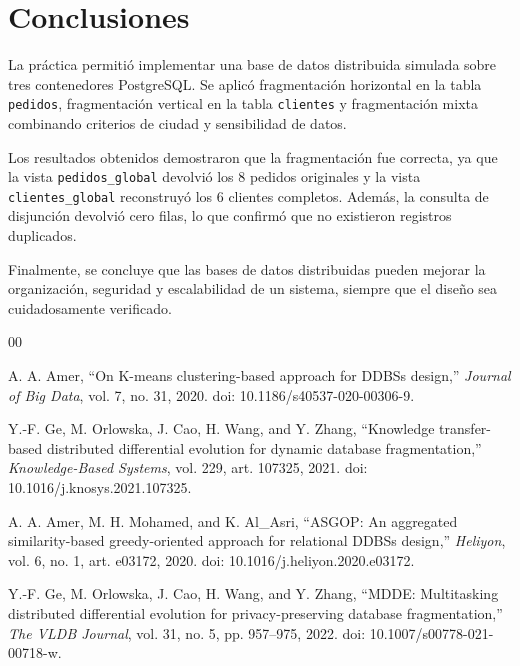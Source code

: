 \documentclass[12pt,a4paper]{article}
\begin{document}
\section{Conclusiones}

La práctica permitió implementar una base de datos distribuida simulada sobre tres contenedores PostgreSQL. Se aplicó fragmentación horizontal en la tabla \texttt{pedidos}, fragmentación vertical en la tabla \texttt{clientes} y fragmentación mixta combinando criterios de ciudad y sensibilidad de datos.

Los resultados obtenidos demostraron que la fragmentación fue correcta, ya que la vista \texttt{pedidos\_global} devolvió los 8 pedidos originales y la vista \texttt{clientes\_global} reconstruyó los 6 clientes completos. Además, la consulta de disjunción devolvió cero filas, lo que confirmó que no existieron registros duplicados.

Finalmente, se concluye que las bases de datos distribuidas pueden mejorar la organización, seguridad y escalabilidad de un sistema, siempre que el diseño sea cuidadosamente verificado.

\begin{thebibliography}{00}

A. A. Amer, ``On K-means clustering-based approach for DDBSs design,'' \textit{Journal of Big Data}, vol. 7, no. 31, 2020. doi: 10.1186/s40537-020-00306-9.

Y.-F. Ge, M. Orlowska, J. Cao, H. Wang, and Y. Zhang, ``Knowledge transfer-based distributed differential evolution for dynamic database fragmentation,'' \textit{Knowledge-Based Systems}, vol. 229, art. 107325, 2021. doi: 10.1016/j.knosys.2021.107325.

A. A. Amer, M. H. Mohamed, and K. Al\_Asri, ``ASGOP: An aggregated similarity-based greedy-oriented approach for relational DDBSs design,'' \textit{Heliyon}, vol. 6, no. 1, art. e03172, 2020. doi: 10.1016/j.heliyon.2020.e03172.

Y.-F. Ge, M. Orlowska, J. Cao, H. Wang, and Y. Zhang, ``MDDE: Multitasking distributed differential evolution for privacy-preserving database fragmentation,'' \textit{The VLDB Journal}, vol. 31, no. 5, pp. 957--975, 2022. doi: 10.1007/s00778-021-00718-w.

\end{thebibliography}
\end{document}
